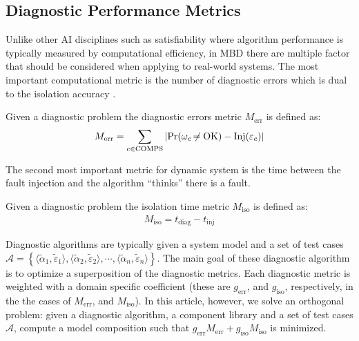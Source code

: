 \subsection{Diagnostic Performance Metrics}
%
Unlike other AI disciplines such as satisfiability where algorithm
performance is typically measured by computational efficiency, in MBD
there are multiple factor that should be considered when applying to
real-world systems. The most important computational metric is the
number of diagnostic errors which is dual to the isolation accuracy
\cite{feldman10empirical}.
%
\begin{definition}
%
Given a diagnostic problem \dproblem the diagnostic errors metric
$M_{\mathrm{err}}$ is defined as:
%
\begin{eqnarray}
%
M_{\mathrm{err}} = \sum_{c \in \comps}{\left|\pr(\omega_c \ne \ok) - \inj(\varepsilon_c)\right|}
%
\end{eqnarray}
%
\end{definition}
%
The second most important metric for dynamic system is the time
between the fault injection and the algorithm ``thinks'' there is a
fault.
%
\begin{definition}
%
Given a diagnostic problem \dproblem the isolation time metric
$M_{\mathrm{iso}}$ is defined as:
%
\begin{eqnarray}
%
M_{\mathrm{iso}} = t_{\mathrm{diag}} - t_{\mathrm{inj}}
%
\end{eqnarray}
%
\end{definition}
%
Diagnostic algorithms are typically given a system model \sd and a set
of test cases $\mathcal{A} = \left\{\langle\tilde\alpha_1,
\tilde\varepsilon_1\rangle, \langle\tilde\alpha_2,
\tilde\varepsilon_2\rangle, \cdots, \langle\tilde\alpha_n,
\tilde\varepsilon_n\rangle\right\}$. The main goal of these diagnostic
algorithm is to optimize a superposition of the diagnostic
metrics. Each diagnostic metric is weighted with a domain specific
coefficient (these are $g_{\mathrm{err}}$, and $g_{\mathrm{iso}}$,
respectively, in the the cases of $M_{\mathrm{err}}$, and
$M_{\mathrm{iso}}$). In this article, however, we solve an orthogonal
problem: given a diagnostic algorithm, a component library and a set
of test cases $\mathcal{A}$, compute a model composition \sd such that
$g_{\mathrm{err}}M_{\mathrm{err}} + g_{\mathrm{iso}}M_{\mathrm{iso}}$
is minimized.
